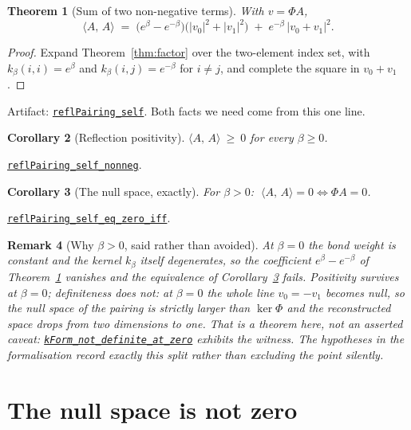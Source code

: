 \documentclass[11pt]{article}
\newtheorem{theorem}{Theorem}[section]
\newtheorem{corollary}[theorem]{Corollary}
\newtheorem{remark}[theorem]{Remark}
\theoremstyle{definition}
\newcommand{\anchor}{673d1df122ac7110e6f7b52795b44a02d38d8d24}
\newcommand{\osline}[3]{%
  \href{https://github.com/lluiseriksson/THE-ERIKSSON-PROGRAMME/blob/\anchor/YangMills/OS/#1.lean\#L#2}{\nolinkurl{#3}}}
\newcommand{\inn}[2]{\langle #1,\, #2\rangle}
\begin{document}
\begin{theorem}[Sum of two non-negative terms]\label{thm:sos}
With $v = \Phi A$,
\[
  \inn{A}{A} \;=\;
  \bigl(e^{\beta}-e^{-\beta}\bigr)\bigl(|v_0|^2+|v_1|^2\bigr)
  \;+\; e^{-\beta}\,|v_0+v_1|^2 .
\]
\end{theorem}

\begin{proof}
Expand Theorem~\ref{thm:factor} over the two-element index set, with
$k_\beta(i,i)=e^\beta$ and $k_\beta(i,j)=e^{-\beta}$ for $i\neq j$, and complete
the square in $v_0+v_1$.
\end{proof}

Artifact: \osline{Z2Quotient}{143}{reflPairing\_self}.  Both facts we need come
from this one line.

\begin{corollary}[Reflection positivity]\label{cor:pos}
$\inn{A}{A}\ \ge\ 0$ for every $\beta\ge 0$.
\end{corollary}

\osline{Z2Quotient}{159}{reflPairing\_self\_nonneg}.

\begin{corollary}[The null space, exactly]\label{cor:null}
For $\beta>0$: $\;\inn{A}{A}=0 \iff \Phi A = 0$.
\end{corollary}

\osline{Z2Quotient}{171}{reflPairing\_self\_eq\_zero\_iff}.

\begin{remark}[Why $\beta>0$, said rather than avoided]\label{rem:betapos}
At $\beta=0$ the bond weight is constant and the kernel $k_\beta$ itself
degenerates, so the coefficient $e^\beta-e^{-\beta}$ of
Theorem~\ref{thm:sos} vanishes and the equivalence of
Corollary~\ref{cor:null} fails.  Positivity survives at $\beta=0$;
definiteness does not: at $\beta=0$ the whole line $v_0=-v_1$ becomes null, so the
null space of the pairing is strictly larger than $\ker\Phi$ and the reconstructed
space drops from two dimensions to one.  That is a theorem here, not an
asserted caveat: \osline{Z2Quotient}{398}{kForm\_not\_definite\_at\_zero}
exhibits the witness.  The hypotheses in the formalisation record exactly this
split rather than excluding the point silently.
\end{remark}

\section{The null space is not zero}
\end{document}
